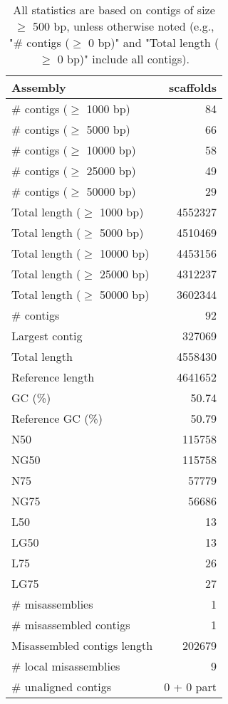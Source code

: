 \documentclass[12pt,a4paper]{article}
\begin{document}
\begin{table}[ht]
\begin{center}
\caption{All statistics are based on contigs of size $\geq$ 500 bp, unless otherwise noted (e.g., "\# contigs ($\geq$ 0 bp)" and "Total length ($\geq$ 0 bp)" include all contigs).}
\begin{tabular}{|l*{1}{|r}|}
\hline
Assembly & scaffolds \\ \hline
\# contigs ($\geq$ 1000 bp) & 84 \\ \hline
\# contigs ($\geq$ 5000 bp) & 66 \\ \hline
\# contigs ($\geq$ 10000 bp) & 58 \\ \hline
\# contigs ($\geq$ 25000 bp) & 49 \\ \hline
\# contigs ($\geq$ 50000 bp) & 29 \\ \hline
Total length ($\geq$ 1000 bp) & 4552327 \\ \hline
Total length ($\geq$ 5000 bp) & 4510469 \\ \hline
Total length ($\geq$ 10000 bp) & 4453156 \\ \hline
Total length ($\geq$ 25000 bp) & 4312237 \\ \hline
Total length ($\geq$ 50000 bp) & 3602344 \\ \hline
\# contigs & 92 \\ \hline
Largest contig & 327069 \\ \hline
Total length & 4558430 \\ \hline
Reference length & 4641652 \\ \hline
GC (\%) & 50.74 \\ \hline
Reference GC (\%) & 50.79 \\ \hline
N50 & 115758 \\ \hline
NG50 & 115758 \\ \hline
N75 & 57779 \\ \hline
NG75 & 56686 \\ \hline
L50 & 13 \\ \hline
LG50 & 13 \\ \hline
L75 & 26 \\ \hline
LG75 & 27 \\ \hline
\# misassemblies & 1 \\ \hline
\# misassembled contigs & 1 \\ \hline
Misassembled contigs length & 202679 \\ \hline
\# local misassemblies & 9 \\ \hline
\# unaligned contigs & 0 + 0 part \\ \hline

\end{tabular}
\end{center}
\end{table}
\end{document}
